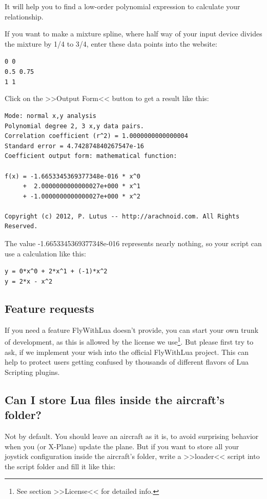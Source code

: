 \documentclass[11pt,parskip=half,a4paper]{scrartcl}
\begin{document}
It will help you to find a low-order polynomial expression to calculate your relationship.

If you want to make a mixture spline, where half way of your input device divides the mixture by 1/4 to 3/4, enter these data points into the website:

\verb|0 0|\\
\verb|0.5 0.75|\\
\verb|1 1|

Click on the >>Output Form<< button to get a result like this:

\begin{lstlisting}[firstnumber=1]
Mode: normal x,y analysis
Polynomial degree 2, 3 x,y data pairs.
Correlation coefficient (r^2) = 1.0000000000000004
Standard error = 4.742874840267547e-16
Coefficient output form: mathematical function:

f(x) = -1.6653345369377348e-016 * x^0
     +  2.0000000000000027e+000 * x^1
     + -1.0000000000000027e+000 * x^2

Copyright (c) 2012, P. Lutus -- http://arachnoid.com. All Rights Reserved.
\end{lstlisting}

The value -1.6653345369377348e-016 represents nearly nothing, so your script can use a calculation like this:

\verb|y = 0*x^0 + 2*x^1 + (-1)*x^2|\\
\verb|y = 2*x - x^2|

\subsection{Feature requests}

If you need a feature FlyWithLua doesn't provide, you can start your own trunk of development, as this is allowed by the license we use\footnote{See section >>License<< for detailed info.}. But please first try to ask, if we implement your wish into the official FlyWithLua project. This can help to protect users getting confused by thousands of different flavors of Lua Scripting plugins.

\subsection{Can I store Lua files inside the aircraft's folder?}

Not by default. You should leave an aircraft as it is, to avoid surprising behavior when you (or X-Plane) update the plane. But if you want to store all your joystick configuration inside the aircraft's folder, write a >>loader<< script into the script folder and fill it like this:
\end{document}
